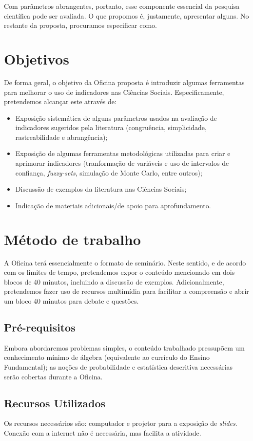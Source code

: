 \documentclass[article,12pt,oneside,a4paper,english,brazilian]{abntex2}
\begin{document}
Com parâmetros abrangentes, portanto, esse componente essencial da pesquisa científica pode ser avaliada\cite{adcock2001}. O que propomos é, justamente, apresentar alguns. No restante da proposta, procuramos especificar como.

\section{Objetivos}

De forma geral, o objetivo da Oficina proposta é introduzir algumas ferramentas para melhorar o uso de indicadores nas Ciências Sociais. Especificamente, pretendemos alcançar este através de:
\begin{itemize}
\item Exposição sistemática de alguns parâmetros usados na avaliação de indicadores sugeridos pela literatura (congruência, simplicidade, rastreabilidade e abrangência);
\item Exposição de algumas ferramentas metodológicas utilizadas para criar e aprimorar indicadores (tranformação de variáveis e uso de intervalos de confiança, \emph{fuzzy-sets}, simulação de Monte Carlo, entre outros);
\item Discussão de exemplos da literatura nas Ciências Sociais;
\item Indicação de materiais adicionais/de apoio para aprofundamento.
\end{itemize}


\section{Método de trabalho}

A Oficina terá essencialmente o formato de seminário. Neste sentido, e de acordo com os limites de tempo, pretendemos expor o conteúdo mencionado em dois blocos de 40 minutos, incluindo a discussão de exemplos. Adicionalmente, pretendemos fazer uso de recursos multimídia para facilitar a compreensão e abrir um bloco 40 minutos para debate e questões.

\subsection{Pré-requisitos}

Embora abordaremos problemas simples, o conteúdo trabalhado pressupõem um conhecimento mínimo de álgebra (equivalente ao currículo do Ensino Fundamental); as noções de probabilidade e estatística descritiva necessárias serão cobertas durante a Oficina.

\subsection{Recursos Utilizados}

Os recursos necessários são: computador e projetor para a exposição de \emph{slides}. Conexão com a internet não é necessária, mas facilita a atividade.
\postextual


\end{document}
